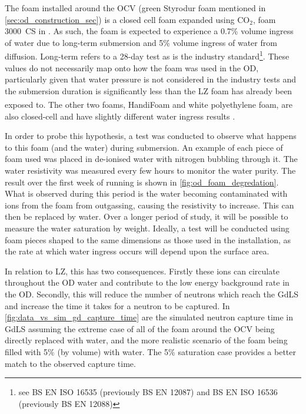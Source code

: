 \par
The foam installed around the OCV (green Styrodur foam mentioned in \autoref{sec:od_construction_sec}) is a closed cell foam expanded using CO$_2$, foam 3000~CS in \cite{styrodur_water_ingress_ref}.
As such, the foam is expected to experience a 0.7\% volume ingress of water due to long-term submersion and 5\% volume ingress of water from diffusion.
Long-term refers to a 28-day test as is the industry standard\footnote{see BS EN ISO 16535 (previously BS EN 12087) and BS EN ISO 16536 (previously BS EN 12088)}.
These values do not necessarily map onto how the foam was used in the OD, particularly given that water pressure is not considered in the industry tests and the submersion duration is significantly less than the LZ foam has already been exposed to.
The other two foams, HandiFoam\textsuperscript{\textregistered} and white polyethylene foam, are also closed-cell and have slightly different water ingress results \cite{handifoam_water_ingress_ref, white_foam_ref}. 
\par
In order to probe this hypothesis, a test was conducted to observe what happens to this foam (and the water) during submersion.
An example of each piece of foam used was placed in de-ionised water with nitrogen bubbling through it. 
The water resistivity was measured every few hours to monitor the water purity.
The result over the first week of running is shown in \autoref{fig:od_foam_degredation}.
What is observed during this period is the water becoming contaminated with ions from the foam from outgassing, causing the resistivity to increase.
This can then be replaced by water.
Over a longer period of study, it will be possible to measure the water saturation by weight.
Ideally, a test will be conducted using foam pieces shaped to the same dimensions as those used in the installation, as the rate at which water ingress occurs will depend upon the surface area.
\par
In relation to LZ, this has two consequences.
Firstly these ions can circulate throughout the OD water and contribute to the low energy background rate in the OD.
Secondly, this will reduce the number of neutrons which reach the GdLS and increase the time it takes for a neutron to be captured.
In \autoref{fig:data_vs_sim_gd_capture_time} are the simulated neutron capture time in GdLS assuming the extreme case of all of the foam around the OCV being directly replaced with water, and the more realistic scenario of the foam being filled with 5\% (by volume) with water.
The 5\% saturation case provides a better match to the observed capture time.

